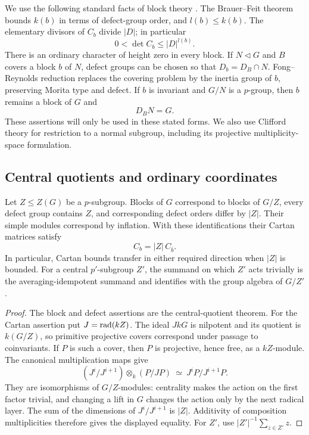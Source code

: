 We use the following standard facts of block theory
\cite{Linckelmann,BrauerFeit}.  The Brauer--Feit theorem bounds \(k(b)\)
in terms of defect-group order, and \(l(b)\le k(b)\).  The elementary
divisors of \(C_b\) divide \(|D|\); in particular
\[
 0<\det C_b\le |D|^{l(b)}.
\]
There is an ordinary character of height zero in every block.
If \(N\lhd G\) and \(B\) covers a block \(b\) of \(N\), defect groups
can be chosen so that \(D_b=D_B\cap N\).  Fong--Reynolds reduction
replaces the covering problem by the inertia group of \(b\), preserving
Morita type and defect.  If \(b\) is invariant and \(G/N\) is a
\(p\)-group, then \(b\) remains a block of \(G\) and
\[
 D_BN=G.
\]
These assertions will only be used in these stated forms.  We also
use Clifford theory for restriction to a normal subgroup, including
its projective multiplicity-space formulation.

\subsection{Central quotients and ordinary coordinates}

\begin{lemma}
\label{lem:central-transfer}
Let \(Z\le Z(G)\) be a \(p\)-subgroup.  Blocks of \(G\) correspond to
blocks of \(G/Z\), every defect group contains \(Z\), and corresponding
defect orders differ by \(|Z|\).  Their simple modules correspond by
inflation.  With these identifications their Cartan matrices satisfy
\[
 C_b=|Z|\,C_{\bar b}.
\]
In particular, Cartan bounds transfer in either required direction
when \(|Z|\) is bounded.  For a central \(p'\)-subgroup \(Z'\), the
summand on which \(Z'\) acts trivially is the averaging-idempotent
summand and identifies with the group algebra of \(G/Z'\).
\end{lemma}

\begin{proof}
The block and defect assertions are the central-quotient theorem.
For the Cartan assertion put \(J=\operatorname{rad}(kZ)\).
The ideal \(JkG\) is nilpotent and its quotient is \(k(G/Z)\), so
primitive projective covers correspond under passage to coinvariants.
If \(P\) is such a cover, then \(P\) is projective, hence free, as a
\(kZ\)-module.  The canonical multiplication maps give
\[
 (J^i/J^{i+1})\otimes_k(P/JP)
       \ \simeq\ J^iP/J^{i+1}P .
\]
They are isomorphisms of \(G/Z\)-modules: centrality makes the action
on the first factor trivial, and changing a lift in \(G\) changes
the action only by the next radical layer.  The sum of the dimensions
of \(J^i/J^{i+1}\) is \(|Z|\).  Additivity of composition multiplicities
therefore gives the displayed equality.  For \(Z'\), use
\(|Z'|^{-1}\sum_{z\in Z'}z\).
\end{proof}

